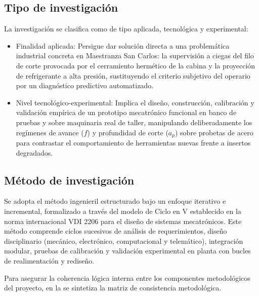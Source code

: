 \subsection{Tipo de investigación}
La investigación se clasifica como de tipo aplicada, tecnológica y experimental:
\begin{itemize}
    \item Finalidad aplicada: Persigue dar solución directa a una problemática industrial concreta en Maestranza San Carlos: la supervisión a ciegas del filo de corte provocada por el cerramiento hermético de la cabina y la proyección de refrigerante a alta presión, sustituyendo el criterio subjetivo del operario por un diagnóstico predictivo automatizado.
    \item Nivel tecnológico-experimental: Implica el diseño, construcción, calibración y validación empírica de un prototipo mecatrónico funcional en banco de pruebas y sobre maquinaria real de taller, manipulando deliberadamente los regímenes de avance ($f$) y profundidad de corte ($a_p$) sobre probetas de acero para contrastar el comportamiento de herramientas nuevas frente a insertos degradados.
\end{itemize}

\subsection{Método de investigación}
Se adopta el método ingenieril estructurado bajo un enfoque iterativo e incremental, formalizado a través del modelo de Ciclo en V establecido en la norma internacional VDI 2206 para el diseño de sistemas mecatrónicos. Este método comprende ciclos sucesivos de análisis de requerimientos, diseño disciplinario (mecánico, electrónico, computacional y telemático), integración modular, pruebas de calibración y validación experimental en planta con bucles de realimentación y rediseño.

Para asegurar la coherencia lógica interna entre los componentes metodológicos del proyecto, en la  se sintetiza la matriz de consistencia metodológica.

